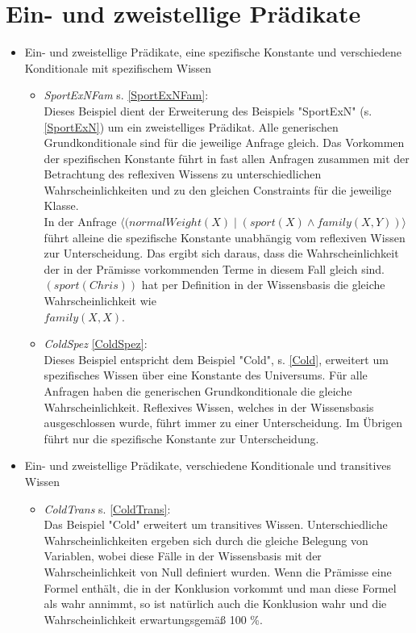 \documentclass[draft]{scrreprt}
\begin{document}
\section{Ein- und zweistellige Prädikate}
\begin{itemize}
\item{Ein- und zweistellige Prädikate, eine spezifische Konstante und verschiedene Konditionale mit spezifischem Wissen}
\begin{itemize}
	\item \textsl{SportExNFam} \label{BSportExNFam} s. \ref{SportExNFam}:\\
	Dieses Beispiel dient der Erweiterung des Beispiels "{}SportExN"{} (s. \ref{SportExN}) um ein zweistelliges Prädikat. Alle generischen Grundkonditionale sind für die jeweilige Anfrage gleich. Das Vorkommen der spezifischen Konstante führt in fast allen Anfragen zusammen mit der Betrachtung des reflexiven Wissens zu unterschiedlichen Wahrscheinlichkeiten und zu den gleichen Constraints für die jeweilige Klasse.\\
	In der Anfrage $\langle (normalWeight(X) \mid (sport(X) \land family(X,Y)) \rangle$\\ führt alleine die spezifische Konstante unabhängig vom reflexiven Wissen zur Unterscheidung. Das ergibt sich daraus, dass die Wahrscheinlichkeit der in der Prämisse vorkommenden Terme in diesem Fall gleich sind. $(sport(Chris)) $ hat per Definition in der Wissensbasis die gleiche Wahrscheinlichkeit wie \\ $family(X,X)$.
	\item \textsl{ColdSpez} \label{BColdSpez} \ref{ColdSpez}:\\
Dieses Beispiel entspricht dem Beispiel "{}Cold"{}, s. \ref{Cold}, erweitert um spezifisches Wissen über eine Konstante des Universums. Für alle Anfragen haben die generischen Grundkonditionale die gleiche Wahrscheinlichkeit. Reflexives Wissen, welches in der Wissensbasis ausgeschlossen wurde, führt immer zu einer Unterscheidung. Im Übrigen führt nur die spezifische Konstante zur Unterscheidung.
\end{itemize}


\item{Ein- und zweistellige Prädikate, verschiedene Konditionale und transitives Wissen}
\begin{itemize}
	\item \textsl{ColdTrans} \label{BColdTrans} s. \ref{ColdTrans}:\\
Das Beispiel "{}Cold"{} erweitert um transitives Wissen. Unterschiedliche Wahrscheinlichkeiten ergeben sich durch die gleiche Belegung von Variablen, wobei diese Fälle in der Wissensbasis mit der Wahrscheinlichkeit von Null definiert wurden. Wenn die Prämisse eine Formel enthält, die in der Konklusion vorkommt und man diese Formel als wahr annimmt, so ist natürlich auch die Konklusion wahr und die Wahrscheinlichkeit erwartungsgemäß 100 \%.


\end{itemize}
\end{itemize}
\end{document}
